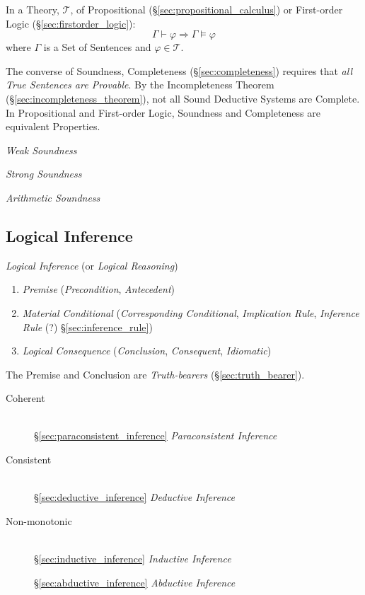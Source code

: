In a Theory, $\mathcal{T}$, of Propositional
(\S\ref{sec:propositional_calculus}) or First-order Logic
(\S\ref{sec:firstorder_logic}):
\[
  \Gamma \vdash \varphi \Rightarrow \Gamma \vDash \varphi
\]
where $\Gamma$ is a Set of Sentences and $\varphi \in \mathcal{T}$.

The converse of Soundness, Completeness (\S\ref{sec:completeness}) requires
that \emph{all True Sentences are Provable}. By the Incompleteness Theorem
(\S\ref{sec:incompleteness_theorem}), not all Sound Deductive Systems are
Complete. In Propositional and First-order Logic, Soundness and Completeness
are equivalent Properties.

\emph{Weak Soundness}

\emph{Strong Soundness}

\emph{Arithmetic Soundness}



\subsection{Logical Inference}\label{sec:logical_inference}

\emph{Logical Inference} (or \emph{Logical Reasoning})

\begin{enumerate}
\item \emph{Premise} (\emph{Precondition}, \emph{Antecedent})

\item \emph{Material Conditional} (\emph{Corresponding Conditional},
  \emph{Implication Rule}, \emph{Inference Rule} (?)
  \S\ref{sec:inference_rule})

\item \emph{Logical Consequence} (\emph{Conclusion},
  \emph{Consequent}, \emph{Idiomatic})
\end{enumerate}

The Premise and Conclusion are \emph{Truth-bearers}
(\S\ref{sec:truth_bearer}).

\begin{description}
\item [Coherent] \hfill\\
  \S\ref{sec:paraconsistent_inference}
  \emph{Paraconsistent Inference}

\item [Consistent] \hfill\\
  \S\ref{sec:deductive_inference} \emph{Deductive Inference}

\item [Non-monotonic] \hfill\\
  \S\ref{sec:inductive_inference} \emph{Inductive Inference}

  \S\ref{sec:abductive_inference} \emph{Abductive Inference}

\end{description}

